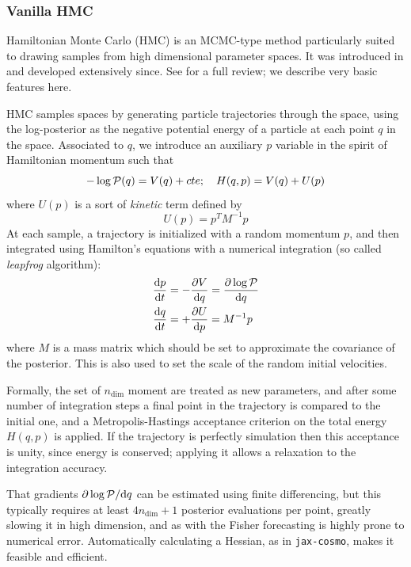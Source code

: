\documentclass[final,5p,times,twocolumn,authoryear]{elsarticle}
\newcommand{\jaxcosmo}{\texttt{jax-cosmo}}
\begin{document}
\subsubsection{Vanilla HMC}
%
Hamiltonian Monte Carlo (HMC) is an MCMC-type method particularly suited to drawing
samples from high dimensional parameter spaces.  It was introduced in \citep{1987PhLB..195..216D}
and developed extensively since.  See \citet{betancourt} for a full review; we describe
very basic features here.

HMC samples spaces by generating particle trajectories through the space, using the log-posterior as the negative potential energy of a particle at each point $q$ in the space. Associated to $q$, we introduce an auxiliary $p$ variable in the spirit of Hamiltonian momentum such that
\begin{equation}
- \log{\cal P}(q) = V(q) + cte; \quad H(q,p) = V(q) + U(p)
\end{equation}
where $U(p)$ is a sort of \textit{kinetic} term defined by 
\begin{equation}
U(p) = p^T M^{-1} p
\end{equation}
At each sample, a trajectory is initialized with a random momentum $p$, and then integrated using Hamilton's equations with a numerical integration (so called \textit{leapfrog} algorithm):
\begin{align}
\frac{\mathrm{d}p}{\mathrm{d}t} &= - \frac{\partial V}{\mathrm{d} q} = \frac{\partial \log{\cal P}}{\mathrm{d} q}\\
\frac{\mathrm{d}q}{\mathrm{d}t} &= + \frac{\partial U}{\mathrm{d} p} = M^{-1} p
\end{align}
where $M$ is a mass matrix which should be set to approximate the covariance of the posterior. This is also used to set the scale of the random initial velocities.

Formally, the set of $n_\mathrm{dim}$ moment are treated as new parameters, and after 
some number of integration steps a final point in the trajectory is compared to the initial one,
and a Metropolis-Hastings acceptance criterion on the total energy $H(q,p)$ is applied. If the trajectory is perfectly simulation then this acceptance is unity, since energy is conserved; applying it allows
a relaxation to the integration accuracy.

That gradients $\partial \log{\cal P} / \mathrm{d} q$ can be estimated using finite differencing,
but this typically requires at least $4 n_{\mathrm{dim}} + 1$ posterior evaluations per point, greatly slowing it
in high dimension, and as with the Fisher forecasting is highly prone to numerical error. Automatically
calculating a Hessian, as in \jaxcosmo, makes it feasible and efficient.
\end{document}
